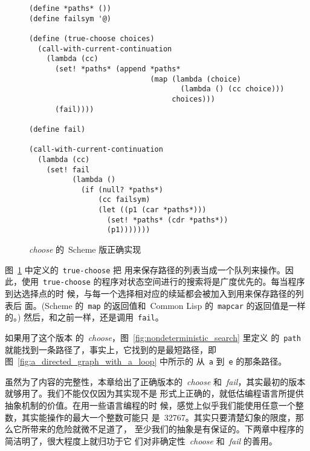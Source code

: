 \begin{figure}
\begin{lstlisting}
(define *paths* ())
(define failsym '@)

(define (true-choose choices)
  (call-with-current-continuation
    (lambda (cc)
      (set! *paths* (append *paths*
                            (map (lambda (choice)
                                   (lambda () (cc choice)))
                                 choices)))
      (fail))))

(define fail)

(call-with-current-continuation
  (lambda (cc)
    (set! fail
          (lambda ()
            (if (null? *paths*)
                (cc failsym)
                (let ((p1 (car *paths*)))
                  (set! *paths* (cdr *paths*))
                  (p1)))))))
\end{lstlisting}
\caption{\emph{choose} 的~Scheme 版正确实现}
\label{fig:correct_choose_in_scheme}
\end{figure}

图~\ref{fig:correct_choose_in_scheme} 中定义的~\texttt{true-choose} 把
用来保存路径的列表当成一个队列来操作。因此，使用~\texttt{true-choose}
的程序对状态空间进行的搜索将是广度优先的。每当程序到达选择点的时
候，与每一个选择相对应的续延都会被加入到用来保存路径的列表后
面。(Scheme 的~\texttt{map} 的返回值和~Common Lisp 的~\texttt{mapcar}
的返回值是一样的。) 然后，和之前一样，还是调用~\texttt{fail}。

如果用了这个版本
的~\emph{choose}，图~\ref{fig:nondeterministic_search} 里定义
的~\texttt{path} 就能找到一条路径了，事实上，它找到的是最短路径，即
图~\ref{fig:a_directed_graph_with_a_loop} 中所示的
从~\texttt{a} 到~\texttt{e} 的那条路径。

虽然为了内容的完整性，本章给出了正确版本的~\emph{choose}
和~\emph{fail}，其实最初的版本就够用了。我们不能仅仅因为其实现不是
形式上正确的，就低估编程语言所提供抽象机制的价值。在用一些语言编程的时
候，感觉上似乎我们能使用任意一个整数，其实能操作的最大一个整数可能只
是~32767。其实只要清楚幻象的限度，那么它所带来的危险就微不足道了，
至少我们的抽象是有保证的。下两章中程序的简洁明了，很大程度上就归功于它
们对非确定性~\emph{choose} 和~\emph{fail} 的善用。

